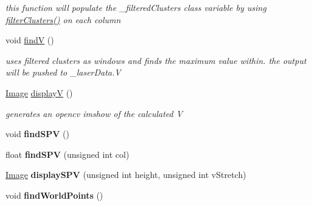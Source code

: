 \begin{DoxyCompactItemize}
\begin{DoxyCompactList}\small\item\em this function will populate the \+\_\+filtered\+Clusters class variable by using \hyperlink{classLaserLoadImage_a52449eec749ada197fe003cc3a84d4ac}{filter\+Clusters()} on each column \end{DoxyCompactList}\item 
void \hyperlink{classLaserLoadImage_aef969dd632105811e0d50888523377ad}{findV} ()\hypertarget{classLaserLoadImage_aef969dd632105811e0d50888523377ad}{}\label{classLaserLoadImage_aef969dd632105811e0d50888523377ad}

\begin{DoxyCompactList}\small\item\em uses filtered clusters as windows and finds the maximum value within. the output will be pushed to \+\_\+laser\+Data.\+V \end{DoxyCompactList}\item 
\hyperlink{classImage}{Image} \hyperlink{classLaserLoadImage_a942c3c8c57686f22f97f8a31c3449710}{displayV} ()\hypertarget{classLaserLoadImage_a942c3c8c57686f22f97f8a31c3449710}{}\label{classLaserLoadImage_a942c3c8c57686f22f97f8a31c3449710}

\begin{DoxyCompactList}\small\item\em generates an opencv imshow of the calculated V \end{DoxyCompactList}\item 
void {\bfseries find\+S\+PV} ()\hypertarget{classLaserLoadImage_a1523df713b4695ad9c7fb3c5470c7e48}{}\label{classLaserLoadImage_a1523df713b4695ad9c7fb3c5470c7e48}

\item 
float {\bfseries find\+S\+PV} (unsigned int col)\hypertarget{classLaserLoadImage_a8190901295b250ebe2e0e4786522ce55}{}\label{classLaserLoadImage_a8190901295b250ebe2e0e4786522ce55}

\item 
\hyperlink{classImage}{Image} {\bfseries display\+S\+PV} (unsigned int height, unsigned int v\+Stretch)\hypertarget{classLaserLoadImage_a63e9d5a7f55a8a567c0f166f572b2dbc}{}\label{classLaserLoadImage_a63e9d5a7f55a8a567c0f166f572b2dbc}

\item 
void {\bfseries find\+World\+Points} ()\hypertarget{classLaserLoadImage_a70213542b7599c5162136dad26f0f9cf}{}\label{classLaserLoadImage_a70213542b7599c5162136dad26f0f9cf}


\end{DoxyCompactItemize}
